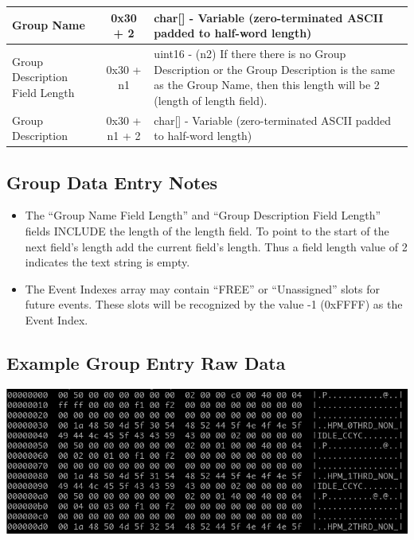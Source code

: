 \documentclass[14]{article}
\begin{document}
\begin{tabular}[l]{|p{5cm}|c|p{7cm}|}
  \hline
  Group Name & 0x30 + 2 & char[] - Variable (zero-terminated ASCII padded to
                          half-word length) \\
  \hline
  Group Description Field Length & 0x30 + n1 & uint16 - (n2) If there there is no
                                               Group Description or the Group
                                               Description is the same as the
                                               Group Name, then this length
                                               will be 2 (length of length
                                               field). \\
  \hline
  Group Description & 0x30 + n1 + 2 & char[] - Variable (zero-terminated ASCII
                                      padded to half-word length) \\
  \hline
\end{tabular}

\subsection{Group Data Entry Notes}
\begin{itemize}
\item The ``Group Name Field Length'' and ``Group Description Field Length'' fields
  INCLUDE the length of the length field. To point to the start of the next
  field's length add the current field's length. Thus a field length value of 2
  indicates the text string is empty.
\item The Event Indexes array may contain ``FREE'' or ``Unassigned'' slots for
  future events. These slots will be recognized by the value -1 (0xFFFF) as the
  Event Index.
\end{itemize}

\subsection{Example Group Entry Raw Data}
\includegraphics[scale=0.6]{groups_raw.png}
\end{document}
